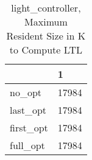 \begin{table}
\caption{light\_controller, Maximum Resident Size in K to Compute LTL}
\label{light_controller_LTL_size}
\begin{tabular}{ll}
\toprule
 & 1 \\
\midrule
no\_opt & 17984 \\
last\_opt & 17984 \\
first\_opt & 17984 \\
full\_opt & 17984 \\
\bottomrule
\end{tabular}
\end{table}
